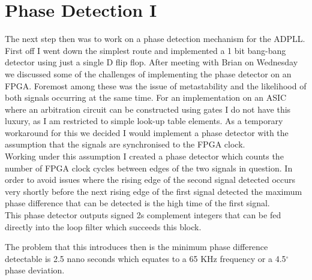 \documentclass[a4paper,12pt]{report}
\begin{document}
\section*{Phase Detection I}
The next step then was to work on a phase detection mechanism for the ADPLL. First off I went down the simplest route and implemented a 1 bit bang-bang detector using just a single D flip flop. After meeting with Brian on Wednesday we discussed some of the challenges of implementing the phase detector on an FPGA. Foremost among these was the issue of metastability and the likelihood of both signals occurring at the same time. For an implementation on an ASIC where an arbitration circuit can be constructed using gates I do not have this luxury, as I am restricted to simple look-up table elements. As a temporary workaround for this we decided I would implement a phase detector with the assumption that the signals are synchronised to the FPGA clock.\\
Working under this assumption I created a phase detector which counts the number of FPGA clock cycles between edges of the two signals in question. In order to avoid issues where the rising edge of the second signal detected occurs very shortly before the next rising edge of the first signal detected the maximum phase difference that can be detected is the high time of the first signal.\\
This phase detector outputs signed 2s complement integers that can be fed directly into the loop filter which succeeds this block.

The problem that this introduces then is the minimum phase difference detectable is 2.5 nano seconds which equates to a 65 KHz frequency or a 4.5$^\circ$ phase deviation.
\end{document}
